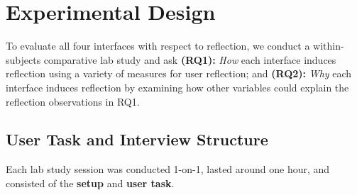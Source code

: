 \section{Experimental Design}
\label{experiment}

To evaluate all four interfaces with respect to  reflection, we conduct a within-subjects comparative lab study and
ask 
\textbf{(RQ1):} \textit{How} each interface induces reflection using a variety of measures for user reflection; and
\textbf{(RQ2):} \textit{Why} each interface induces reflection by examining how other  variables could explain the reflection observations in RQ1.

\subsection{User Task and Interview Structure}
\label{task-structure}

Each lab study session was conducted 1-on-1, lasted around one hour, and consisted of the \textbf{setup} and \textbf{user task}.

